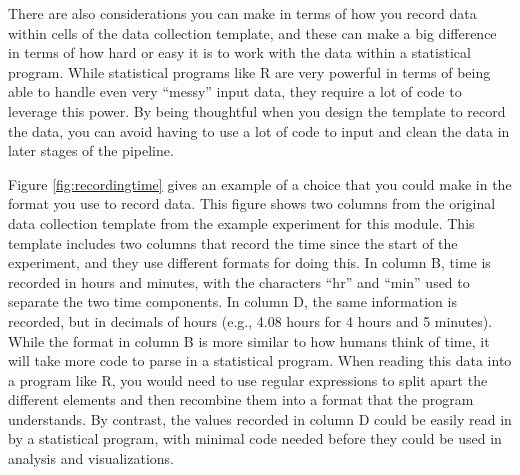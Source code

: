 \documentclass[]{tufte-book}
\begin{document}
There are also considerations you can make in terms of how you record data within
cells of the data collection template, and these can make a big difference in terms
of how hard or easy it is to work with the data within a statistical program. While
statistical programs like R are very powerful in terms of being able to handle even
very ``messy'' input data, they require a lot of code to leverage this power. By being
thoughtful when you design the template to record the data, you can avoid having to
use a lot of code to input and clean the data in later stages of the pipeline.

Figure \ref{fig:recordingtime} gives an example of a choice that you could make
in the format you use to record data. This figure shows two columns from the
original data collection template from the example experiment for this module.
This template includes two columns that record the time since the start of the
experiment, and they use different formats for doing this. In column B, time is
recorded in hours and minutes, with the characters ``hr'' and ``min'' used to
separate the two time components. In column D, the same information is recorded,
but in decimals of hours (e.g., 4.08 hours for 4 hours and 5 minutes). While the
format in column B is more similar to how humans think of time, it will take
more code to parse in a statistical program. When reading this data into a
program like R, you would need to use regular expressions to split apart the
different elements and then recombine them into a format that the program
understands. By contrast, the values recorded in column D could be easily read
in by a statistical program, with minimal code needed before they could be used
in analysis and visualizations.
\end{document}
